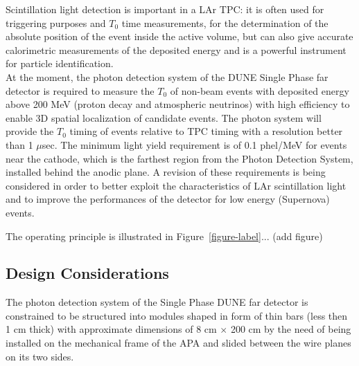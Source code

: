 Scintillation light detection is important in a LAr TPC: it is often 
used for triggering purposes and $T_0$ time measurements, for the 
determination of the absolute position of the event inside the active volume, 
but can also give accurate calorimetric measurements of the deposited energy 
and is a powerful instrument for particle identification.\\

At the moment, the photon detection system of  the DUNE Single Phase far 
detector is required to measure the $T_0$ of non-beam events with deposited 
energy above 200 MeV (proton decay and atmospheric neutrinos) with high 
efficiency to enable 3D spatial localization of candidate events. The photon
system will provide the $T_0$ timing of events relative to TPC timing with a 
resolution better than 1 $\mu$sec. The minimum light yield requirement is of 
0.1 phel/MeV for events near the cathode, which is the farthest region from 
the Photon Detection System, installed behind the anodic plane. A revision 
of these requirements is being considered in order to better exploit the 
characteristics of LAr scintillation light and to improve the performances 
of the detector for low energy (Supernova) events.


The operating principle is illustrated in Figure~\ref{figure-label}... (add figure)



\subsection{Design Considerations}
\label{sec:fdsp-pd-des-consid}
The photon detection system of the Single Phase DUNE far detector is 
constrained to be structured into modules shaped in form of thin bars (less 
then 1 cm thick) with approximate dimensions of 8 cm $\times$ 200 cm by the need of 
being installed on the mechanical frame of the APA and slided between the wire
planes on its two sides.

